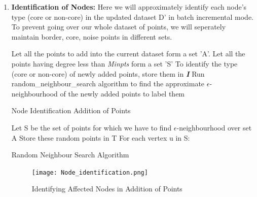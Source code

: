 \documentclass[acmsmall]{acmart}
\begin{document}
\begin{enumerate}

\item \textbf{Identification of Nodes: }
Here we will approximately identify each node's type (core or non-core) in the updated dataset D' in batch incremental mode. To prevent going over our whole dataset of points, we will seperately maintain border, core, noise points in different sets.

\begin{algorithm}
    \SetAlgoLined
    Let all the points to add into the current dataset form a set 'A'. Let all the points having degree less than \textit{Minpts} form a set 'S'\;
    To identify the type (core or non-core) of newly added points, store them in \textit{\textbf{I}}\;
    Run random\_neighbour\_search algorithm to find the approximate $\epsilon$-neighbourhood of the newly added points to label them\;
    \caption{Node Identification Addition of Points}
\end{algorithm}

\begin{algorithm}
    \SetAlgoLined
    Let S be the set of points for which we have to find $\epsilon$-neighbourhood over set A\;
    Store these random points in T\;
    For each vertex u in S:
    \caption{Random Neighbour Search Algorithm}
\end{algorithm}
   
\begin{figure}[H]
    \centering
    \texttt{[image: Node\_identification.png]}
   \caption{Identifying Affected Nodes in Addition of Points}
    \label{fig:my_label}
\end{figure}
        

\end{enumerate}
\end{document}
